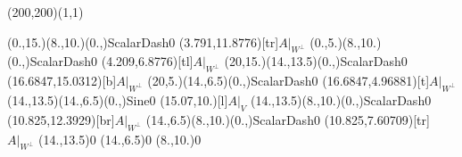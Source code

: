 \unitlength=1bp%

\begin{feynartspicture}(200,200)(1,1)

\FADiagram{}
\FAProp(0.,15.)(8.,10.)(0.,){ScalarDash}{0}
\FALabel(3.791,11.8776)[tr]{$A|_{W^\perp}$}
\FAProp(0.,5.)(8.,10.)(0.,){ScalarDash}{0}
\FALabel(4.209,6.8776)[tl]{$A|_{W^\perp}$}
\FAProp(20,15.)(14.,13.5)(0.,){ScalarDash}{0}
\FALabel(16.6847,15.0312)[b]{$A|_{W^\perp}$}
\FAProp(20,5.)(14.,6.5)(0.,){ScalarDash}{0}
\FALabel(16.6847,4.96881)[t]{$A|_{W^\perp}$}
\FAProp(14.,13.5)(14.,6.5)(0.,){Sine}{0}
\FALabel(15.07,10.)[l]{$A|_V$}
\FAProp(14.,13.5)(8.,10.)(0.,){ScalarDash}{0}
\FALabel(10.825,12.3929)[br]{$A|_{W^\perp}$}
\FAProp(14.,6.5)(8.,10.)(0.,){ScalarDash}{0}
\FALabel(10.825,7.60709)[tr]{$A|_{W^\perp}$}
\FAVert(14.,13.5){0}
\FAVert(14.,6.5){0}
\FAVert(8.,10.){0}
\end{feynartspicture}

